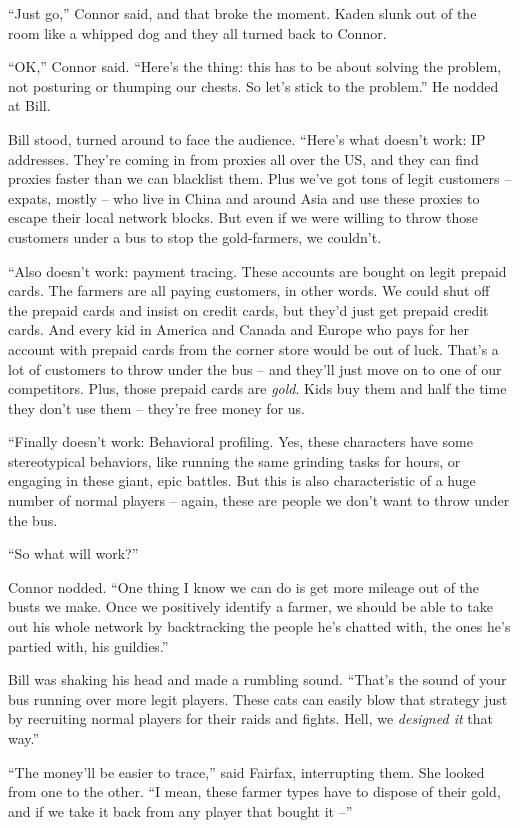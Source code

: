 ``Just go,'' Connor said, and that broke the moment. Kaden slunk out
of the room like a whipped dog and they all turned back to Connor.

``OK,'' Connor said. ``Here's the thing: this has to be about solving
the problem, not posturing or thumping our chests. So let's stick
to the problem.'' He nodded at Bill.

Bill stood, turned around to face the audience. ``Here's what
doesn't work: IP addresses. They're coming in from proxies all over
the US, and they can find proxies faster than we can blacklist
them. Plus we've got tons of legit customers -- expats, mostly --
who live in China and around Asia and use these proxies to escape
their local network blocks. But even if we were willing to throw
those customers under a bus to stop the gold-farmers, we couldn't.

``Also doesn't work: payment tracing. These accounts are bought on
legit prepaid cards. The farmers are all paying customers, in other
words. We could shut off the prepaid cards and insist on credit
cards, but they'd just get prepaid credit cards. And every kid in
America and Canada and Europe who pays for her account with prepaid
cards from the corner store would be out of luck. That's a lot of
customers to throw under the bus -- and they'll just move on to one
of our competitors. Plus, those prepaid cards are \emph{gold}. Kids
buy them and half the time they don't use them -- they're free
money for us.

``Finally doesn't work: Behavioral profiling. Yes, these characters
have some stereotypical behaviors, like running the same grinding
tasks for hours, or engaging in these giant, epic battles. But this
is also characteristic of a huge number of normal players -- again,
these are people we don't want to throw under the bus.

``So what will work?''

Connor nodded. ``One thing I know we can do is get more mileage out
of the busts we make. Once we positively identify a farmer, we
should be able to take out his whole network by backtracking the
people he's chatted with, the ones he's partied with, his
guildies.''

Bill was shaking his head and made a rumbling sound. ``That's the
sound of your bus running over more legit players. These cats can
easily blow that strategy just by recruiting normal players for
their raids and fights. Hell, we \emph{designed it} that way.''

``The money'll be easier to trace,'' said Fairfax, interrupting them.
She looked from one to the other. ``I mean, these farmer types have
to dispose of their gold, and if we take it back from any player
that bought it --''

